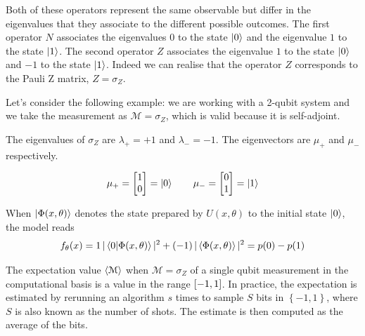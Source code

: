 Both of these operators represent the same observable but differ in the eigenvalues that they associate to the different possible outcomes. The first operator $N$ associates the eigenvalues $0$ to the state $\ket{0}$ and the eigenvalue $1$ to the state $\ket{1}$. The second operator $Z$ associates the eigenvalue $1$ to the state $\ket{0}$ and $-1$ to the state $\ket{1}$. Indeed we can realise that the operator $Z$ corresponds to the Pauli Z matrix, $Z=\sigma_Z$. 

Let's consider the following example: we are working with a 2-qubit system and we take the measurement as $\mathcal{M} = \sigma_Z$, which is valid because it is self-adjoint. 

The eigenvalues of $\sigma_Z$ are $\lambda_{+}=+1$ and $\lambda_{-}=-1$. The eigenvectors are $\mu_{+}$ and $\mu_{-}$ respectively.

\begin{equation}
    \mu_{+}=
    \begin{bmatrix}
    1\\
    0\\
    \end{bmatrix} = \ket{0} 
    \quad \quad
    \mu_{-}=
    \begin{bmatrix}
    0\\
    1\\
    \end{bmatrix} = \ket{1} 
\end{equation}

When $\ket{\Phi(x, \theta)}$ denotes the state prepared by $U(x, \theta)$ to the initial state $\ket{0}$, the model reads
\begin{equation}
    f_{\theta}(x)= 1\,|\braket{0|\Phi(x, \theta)}|^2 + (-1)\,|\braket{\Phi(x, \theta)}|^2 = p(0)-p(1)
\end{equation}

The expectation value $\braket{\mathcal{M}}$ when $\mathcal{M} = \sigma_Z$ of a single qubit measurement in the computational basis is a value in the range $ \interval{-1}{1}$. In practice, the expectation is estimated by rerunning an algorithm $s$ times to sample $S$ bits in $\left \lbrace -1, 1 \right\rbrace$, where $S$ is also known as the number of shots. The estimate is then computed as the average of the bits. 


